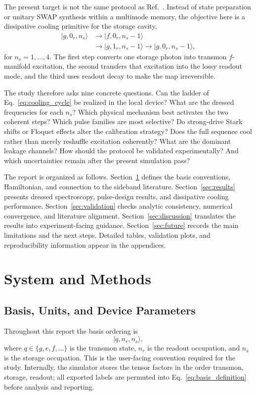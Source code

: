 \documentclass[aps,pra,twocolumn,reprint,floatfix,amsmath,amssymb]{revtex4-2}
\newcommand{\ket}[1]{\lvert #1 \rangle}
\begin{document}
The present target is not the same protocol as Ref.~. Instead of state preparation or unitary SWAP synthesis within a multimode memory, the objective here is a dissipative cooling primitive for the storage cavity,
\begin{equation}
\begin{aligned}
\ket{g,0_r,n_s} &\rightarrow \ket{f,0_r,n_s-1} \\
&\rightarrow \ket{g,1_r,n_s-1}
\rightarrow \ket{g,0_r,n_s-1},
\end{aligned}
\label{eq:cooling_cycle}
\end{equation}
for \(n_s=1,\ldots,4\). The first step converts one storage photon into transmon \(f\)-manifold excitation, the second transfers that excitation into the lossy readout mode, and the third uses readout decay to make the map irreversible.

The study therefore asks nine concrete questions. Can the ladder of Eq.~\eqref{eq:cooling_cycle} be realized in the local device? What are the dressed frequencies for each \(n_s\)? Which physical mechanism best activates the two coherent steps? Which pulse families are most selective? Do strong-drive Stark shifts or Floquet effects alter the calibration strategy? Does the full sequence cool rather than merely reshuffle excitation coherently? What are the dominant leakage channels? How should the protocol be validated experimentally? And which uncertainties remain after the present simulation pass?

The report is organized as follows. Section~\ref{sec:system} defines the basis conventions, Hamiltonian, and connection to the sideband literature. Section~\ref{sec:results} presents dressed spectroscopy, pulse-design results, and dissipative cooling performance. Section~\ref{sec:validation} checks analytic consistency, numerical convergence, and literature alignment. Section~\ref{sec:discussion} translates the results into experiment-facing guidance. Section~\ref{sec:future} records the main limitations and the next steps. Detailed tables, validation plots, and reproducibility information appear in the appendices.

\section{System and Methods}
\label{sec:system}

\subsection{Basis, Units, and Device Parameters}
Throughout this report the basis ordering is
\begin{equation}
\ket{q,n_r,n_s},
\label{eq:basis_definition}
\end{equation}
where \(q\in\{g,e,f,\ldots\}\) is the transmon state, \(n_r\) is the readout occupation, and \(n_s\) is the storage occupation. This is the user-facing convention required for the study. Internally, the simulator stores the tensor factors in the order transmon, storage, readout; all exported labels are permuted into Eq.~\eqref{eq:basis_definition} before analysis and reporting.
\end{document}
